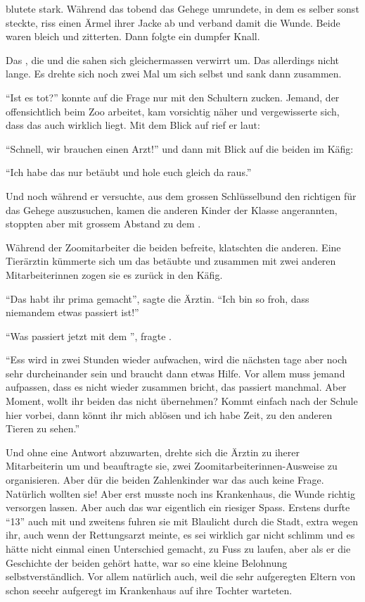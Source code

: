  blutete stark. Während das  tobend das Gehege umrundete, in dem es selber sonst steckte, riss  einen Ärmel ihrer Jacke ab und verband damit die Wunde. Beide waren bleich und zitterten. Dann folgte ein dumpfer Knall.

Das , die  und die  sahen sich gleichermassen verwirrt um. Das  allerdings nicht lange. Es drehte sich noch zwei Mal um sich selbst und sank dann zusammen.

\enquote{Ist es tot?}  konnte auf die Frage nur mit den Schultern zucken. Jemand, der offensichtlich beim Zoo arbeitet, kam vorsichtig näher und vergewisserte sich, dass das  auch wirklich liegt. Mit dem Blick auf  rief er laut:

\enquote{Schnell, wir brauchen einen Arzt!} und dann mit Blick auf die beiden im Käfig:

\enquote{Ich habe das  nur betäubt und hole euch gleich da raus.}

Und noch während er versuchte, aus dem grossen Schlüsselbund den richtigen für das Gehege auszusuchen, kamen die anderen Kinder der Klasse angerannten, stoppten aber mit grossem Abstand zu dem .
  
Während der Zoomitarbeiter die beiden befreite, klatschten die anderen. Eine Tierärztin kümmerte sich um das betäubte  und zusammen mit zwei anderen Mitarbeiterinnen zogen sie es zurück in den Käfig. 

\enquote{Das habt ihr prima gemacht}, sagte die Ärztin. \enquote{Ich bin so froh, dass niemandem etwas passiert ist!}

\enquote{Was passiert jetzt mit dem }, fragte . 

\enquote{Ess wird in zwei Stunden wieder aufwachen, wird die nächsten tage aber noch sehr durcheinander sein und braucht dann etwas Hilfe. Vor allem muss jemand aufpassen, dass es nicht wieder zusammen bricht, das passiert manchmal. Aber Moment, wollt ihr beiden das nicht übernehmen? Kommt einfach nach der Schule hier vorbei, dann könnt ihr mich ablösen und ich habe Zeit, zu den anderen Tieren zu sehen.} 

Und ohne eine Antwort abzuwarten, drehte sich die Ärztin zu iherer Mitarbeiterin um und beauftragte sie, zwei Zoomitarbeiterinnen-Ausweise zu organisieren. Aber dür die beiden Zahlenkinder war das auch keine Frage. Natürlich wollten sie! Aber erst musste  noch ins Krankenhaus, die Wunde richtig versorgen lassen. Aber auch das war eigentlich ein riesiger Spass. Erstens durfte \enquote{13} auch mit und zweitens fuhren sie mit Blaulicht durch die Stadt, extra wegen ihr, auch wenn der Rettungsarzt meinte, es sei wirklich gar nicht schlimm und es hätte nicht einmal einen Unterschied gemacht, zu Fuss zu laufen, aber als er die Geschichte der beiden gehört hatte, war so eine kleine Belohnung selbstverständlich. Vor allem natürlich auch, weil die sehr aufgeregten Eltern von  schon seeehr aufgeregt im Krankenhaus auf ihre Tochter warteten.\hfill {}
\newpage 
